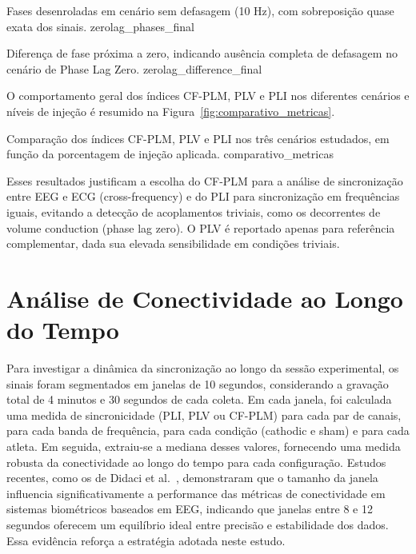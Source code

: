 {Fases desenroladas em cenário sem defasagem (10 Hz), com sobreposição quase exata dos sinais.}
{zerolag_phases_final}

{Diferença de fase próxima a zero, indicando ausência completa de defasagem no cenário de Phase Lag Zero.}
{zerolag_difference_final}


O comportamento geral dos índices CF-PLM, PLV e PLI nos diferentes cenários e níveis de injeção é resumido na Figura~\ref{fig:comparativo_metricas}.

{Comparação dos índices CF-PLM, PLV e PLI nos três cenários estudados, em função da porcentagem de injeção aplicada.}
{comparativo_metricas}

Esses resultados justificam a escolha do CF-PLM para a análise de sincronização entre EEG e ECG (cross-frequency) e do PLI para sincronização em frequências iguais, evitando a detecção de acoplamentos triviais, como os decorrentes de volume conduction (phase lag zero). O PLV é reportado apenas para referência complementar, dada sua elevada sensibilidade em condições triviais.

\section{Análise de Conectividade ao Longo do Tempo}
\label{sec:connectivity_over_time}

Para investigar a dinâmica da sincronização ao longo da sessão experimental, os sinais foram segmentados em janelas de 10 segundos, considerando a gravação total de 4 minutos e 30 segundos de cada coleta. Em cada janela, foi calculada uma medida de sincronicidade (PLI, PLV ou CF-PLM) para cada par de canais, para cada banda de frequência, para cada condição (cathodic e sham) e para cada atleta. Em seguida, extraiu-se a mediana desses valores, fornecendo uma medida robusta da conectividade ao longo do tempo para cada configuração. Estudos recentes, como os de Didaci et al.~\cite{didaci2024how}, demonstraram que o tamanho da janela influencia significativamente a performance das métricas de conectividade em sistemas biométricos baseados em EEG, indicando que janelas entre 8 e 12 segundos oferecem um equilíbrio ideal entre precisão e estabilidade dos dados. Essa evidência reforça a estratégia adotada neste estudo.

